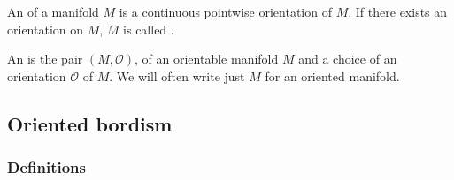 \documentclass[a4paper,11pt]{article}
\begin{document}




\begin{definition}
    An  of a manifold \(M\) is a continuous pointwise orientation of \(M\). If there exists an orientation on \(M\), \(M\) is called .
\end{definition}


\begin{definition}
    An  is the pair \((M,\mathcal{O})\), of an orientable manifold \(M\) and a choice of an orientation \(\mathcal{O}\) of \(M\).
    We will often write just \(M\) for an oriented manifold.
\end{definition}



\subsection{Oriented bordism}

\subsubsection{Definitions}
\end{document}
